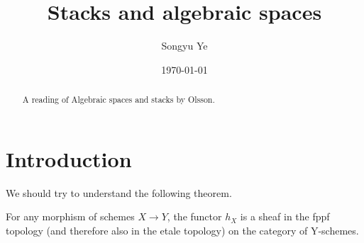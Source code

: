 \documentclass[12pt]{article}
\begin{document}
\rhead{\today}
\cfoot{\thepage}

\title{Stacks and algebraic spaces}

\author{Songyu Ye}
\date{\today}
\maketitle


\begin{abstract}
A reading of Algebraic spaces and stacks by Olsson.
\end{abstract}

\tableofcontents
\section{Introduction}
We should try to understand the following theorem.
\begin{theorem}
    For any morphism of schemes $X\to Y$, the functor $h_X$ is a sheaf in the fppf topology (and therefore also in the etale topology) on the category of Y-schemes.
\end{theorem}
\end{document}
